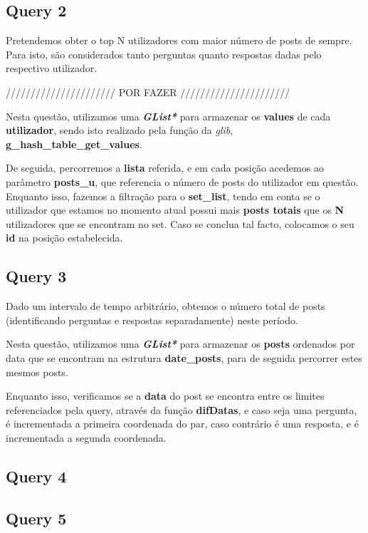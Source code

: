 \documentclass[a4paper]{article}
\begin{document}
\subsection{Query 2}

Pretendemos obter o top N utilizadores com maior número de posts de 
sempre. Para isto, são considerados tanto perguntas quanto respostas 
dadas pelo respectivo utilizador.

////////////////////// POR FAZER //////////////////////

Nesta questão, utilizamos uma \textit{\textbf{GList*}} para armazenar 
os \textbf{values} de cada \textbf{utilizador}, sendo isto realizado
pela função da \textit{glib}, \textbf{g\_hash\_table\_get\_values}.

De seguida, percorremos a \textbf{lista} referida, e em cada posição
acedemos ao parâmetro \textbf{posts\_u}, que referencia o número de 
posts do utilizador em questão. Enquanto isso, fazemos a filtração
para o \textbf{set\_list}, tendo em conta se o utilizador que estamos
no momento atual possui mais \textbf{posts totais} que os \textbf{N} 
utilizadores que se encontram no set. Caso se conclua tal facto,
colocamos o seu \textbf{id} na posição estabelecida.

\subsection{Query 3}

Dado um intervalo de tempo arbitrário, obtemos o número total de posts 
(identificando perguntas e respostas separadamente) neste período.

Nesta questão, utilizamos uma \textit{\textbf{GList*}} para armazenar 
os \textbf{posts} ordenados por data que se encontram na estrutura 
\textbf{date\_posts}, para de seguida percorrer estes mesmos posts.

Enquanto isso, verificamos se a \textbf{data} do post se encontra entre 
os limites referenciados pela query, através da função \textbf{difDatas},
e caso seja uma pergunta, é incrementada a primeira coordenada do par,
caso contrário é uma resposta, e é incrementada a segunda coordenada.

\subsection{Query 4}

\subsection{Query 5}
\end{document}
